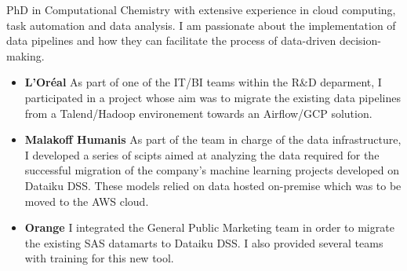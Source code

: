 \documentclass[10pt,a4paper,ragged2e,academicons]{altacv}
\begin{document}

\begin{fullwidth}
\makecvheader
\parbox{.7\paperwidth}{%
PhD in Computational Chemistry with extensive experience in cloud computing, task automation and data analysis. I am passionate about the implementation of data pipelines and how they can facilitate the process of data-driven decision-making.
}

\end{fullwidth}



\begin{itemize}
\item \textbf{L'Oréal} As part of one of the IT/BI teams within the R\&D deparment, I participated in a project whose aim was to migrate the existing data pipelines from a Talend/Hadoop environement towards an Airflow/GCP solution.
\end{itemize}

\divider

\begin{itemize}
\item \textbf{Malakoff Humanis} As part of the team in charge of the data infrastructure, I developed a series of scipts aimed at analyzing the data required for the successful migration of the company's machine learning projects developed on Dataiku DSS. These models relied on data hosted on-premise which was to be moved to the AWS cloud. 
\item \textbf{Orange} I integrated the General Public Marketing team in order to migrate the existing SAS datamarts to Dataiku DSS. I also provided several teams with training for this new tool. 
\end{itemize}
\end{document}
